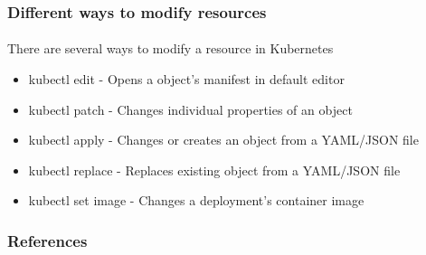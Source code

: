 
\begin{frame}[fragile]
	\frametitle{Different ways to modify resources}
	\framesubtitle{}
	There are several ways to modify a resource in Kubernetes
	\begin{itemize}
		\item kubectl edit - Opens a object's manifest in default editor
		\item kubectl patch - Changes individual properties of an object
		\item kubectl apply - Changes or creates an object from a YAML/JSON file
		\item kubectl replace - Replaces existing object from a YAML/JSON file
		\item kubectl set image - Changes a deployment's container image
	\end{itemize}
\end{frame}


\begin{frame}[allowframebreaks]
\frametitle{References}
\fontsize{5pt}{5pt}\selectfont
\def\newblock{\hskip .11em plus .33em minus .07em}


\normalsize
\end{frame}

